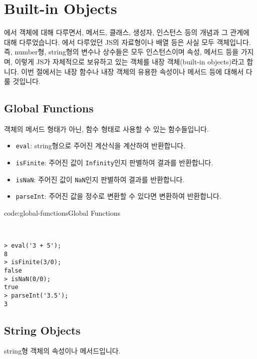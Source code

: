 \section{Built-in Objects} \label{sect:built-in-objects}

에서 객체에 대해 다루면서, 메서드, 클래스, 생성자, 인스턴스 등의 개념과 그 관계에 대해 다루었습니다. 에서 다루었던 JS의 자료형이나 배열 등은 사실 모두 객체입니다. 즉, number형, string형의 변수나 상수들은 모두 인스턴스이며 속성, 메서드 등을 가지며, 이렇게 JS가 자체적으로 보유하고 있는 객체를 내장 객체(built-in objects)라고 합니다. 이번 절에서는 내장 함수나 내장 객체의 유용한 속성이나 메서드 등에 대해서 다룰 것입니다. 

\subsection*{Global Functions}

객체의 메서드 형태가 아닌, 함수 형태로 사용할 수 있는 함수들입니다.

\begin{itemize}
    \item \texttt{eval}: string형으로 주어진 계산식을 계산하여 반환합니다. 
    \item \texttt{isFinite}: 주어진 값이 \texttt{Infinity}인지 판별하여 결과를 반환합니다. 
    \item \texttt{isNaN}: 주어진 값이 \texttt{NaN}인지 판별하여 결과를 반환합니다. 
    \item \texttt{parseInt}: 주어진 값을 정수로 변환할 수 있다면 변환하여 반환합니다. 
\end{itemize}

\begin{codeenv}{code:global-functions}{Global Functions}\begin{verbatim}


> eval('3 + 5');
8
> isFinite(3/0);
false
> isNaN(0/0);
true
> parseInt('3.5');
3
\end{verbatim}
\end{codeenv}

\subsection*{String Objects}

string형 객체의 속성이나 메서드입니다.

